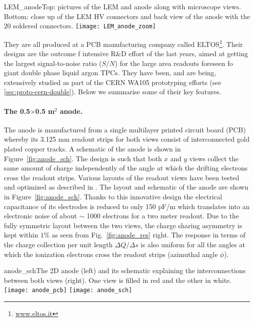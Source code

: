 \begin{cdrfigure}{LEM_anode}{Top: pictures of the LEM and anode along with microscope
  views. Bottom: close up of the LEM HV connectors and back view of the anode with the 20 soldered connectors.}
 \texttt{[image: LEM\_anode\_zoom]}  
 \end{cdrfigure}

 They are all produced at a PCB manufacturing company called  ELTOS\footnote{\url{www.eltos.it}}. Their designs are the outcome
  f intensive R\&D effort of the last years, aimed at getting the   largest signal-to-noise ratio ($S/N$) for the large area readouts
 foreseen fo giant double phase liquid argon TPCs. They have been,  and are being, extensively studied as part of the CERN WA105
 prototyping efforts (see \ref{sec:proto-cern-double}). Below we summarise  some of their key features.

 \paragraph{The 0.5$\times$0.5 m$^2$ anode.}
 The anode is manufactured from a single multilayer printed circuit board (PCB) whereby its 3.125 mm readout strips for both views
 consist of interconnected gold plated copper tracks. A schematic of  the anode is shown in Figure~\ref{fig:anode_sch}. The design is such that
 both $x$ and $y$ views collect the same amount of charge  independently of the angle at which the drifting electrons cross the
 readout strips. Various layouts of the readout views have been tested  and optimized as described in \cite{Cantini:2013yba}. The layout and
 schematic of the anode are shown in Figure~\ref{fig:anode_sch}.  Thanks  to this innovative design the electrical capacitance of its
 electrodes is reduced to only 150 pF/m which translates into an  electronic noise of about $\sim$ 1000 electrons for a two meter
 readout. Due to the fully symmetric layout between the two views, the  charge sharing asymmetry is kept within $1\%$ as seen from
 Fig.~\ref{fig:anode_res} right. The response in terms of the charge  collection per unit length $\Delta Q/\Delta s$ is also uniform for
 all the angles at which the ionization electrons cross the readout strips (azimuthal angle $\phi$).

\begin{cdrfigure}{anode_sch}{The 2D anode (left) and its schematic explaining the
       interconnections between both views (right). One view is filled
       in red and the other in white.}
     \texttt{[image: anode\_pcb]} \hspace{0.2cm} \texttt{[image: anode\_sch]}
\end{cdrfigure}


